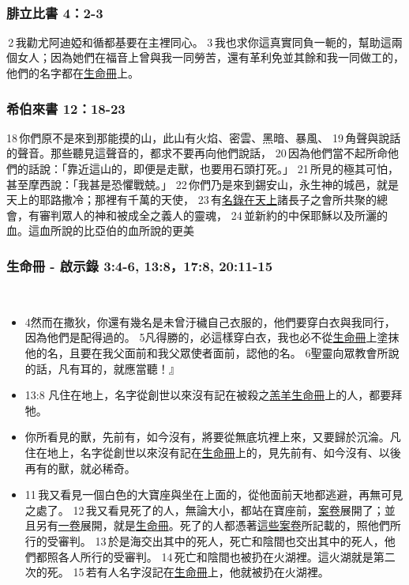  \subsubsection{腓立比書 4：2-3}
 2 我勸尤阿迪婭和循都基要在主裡同心。 3 我也求你這真實同負一軛的，幫助這兩個女人；因為她們在福音上曾與我一同勞苦，還有革利免並其餘和我一同做工的，他們的名字都在\underline{生命冊}上。
 
  \subsubsection{希伯來書 12：18-23}
18 你們原不是來到那能摸的山，此山有火焰、密雲、黑暗、暴風、 19 角聲與說話的聲音。那些聽見這聲音的，都求不要再向他們說話， 20 因為他們當不起所命他們的話說：「靠近這山的，即便是走獸，也要用石頭打死。」 21 所見的極其可怕，甚至摩西說：「我甚是恐懼戰兢。」 22 你們乃是來到錫安山，永生神的城邑，就是天上的耶路撒冷；那裡有千萬的天使， 23 有\underline{名錄在天上}諸長子之會所共聚的總會，有審判眾人的神和被成全之義人的靈魂， 24 並新約的中保耶穌以及所灑的血。這血所說的比亞伯的血所說的更美
 
 
 \subsubsection{生命冊 - 啟示錄 3:4-6, 13:8，17:8, 20:11-15} 
 \begin{itemize} 
\itemsep-.25em
\item 4然而在撒狄，你還有幾名是未曾汙穢自己衣服的，他們要穿白衣與我同行，因為他們是配得過的。 5凡得勝的，必這樣穿白衣，我也必不從\underline{生命冊}上塗抹他的名，且要在我父面前和我父眾使者面前，認他的名。 6聖靈向眾教會所說的話，凡有耳的，就應當聽！』	
\item 13:8 凡住在地上，名字從創世以來沒有記在被殺之\underline{羔羊生命冊}上的人，都要拜牠。
\item 你所看見的獸，先前有，如今沒有，將要從無底坑裡上來，又要歸於沉淪。凡住在地上，名字從創世以來沒有記在\underline{生命冊}上的，見先前有、如今沒有、以後再有的獸，就必稀奇。
\item 11 我又看見一個白色的大寶座與坐在上面的，從他面前天地都逃避，再無可見之處了。 12 我又看見死了的人，無論大小，都站在寶座前，\underline{案卷}展開了；並且另有\underline{一卷}展開，就是\underline{生命冊}。死了的人都憑著\underline{這些案卷}所記載的，照他們所行的受審判。 13 於是海交出其中的死人，死亡和陰間也交出其中的死人，他們都照各人所行的受審判。 14 死亡和陰間也被扔在火湖裡。這火湖就是第二次的死。 15 若有人名字沒記在\underline{生命冊}上，他就被扔在火湖裡。
\end{itemize} 

